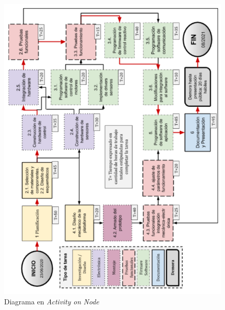 \begin{figure}[htpb]
\centering 
\includegraphics[width=\textwidth]{./Figures/AoN.png}
\caption{Diagrama en \textit{Activity on Node}}
\label{fig:AoN}
\end{figure}



